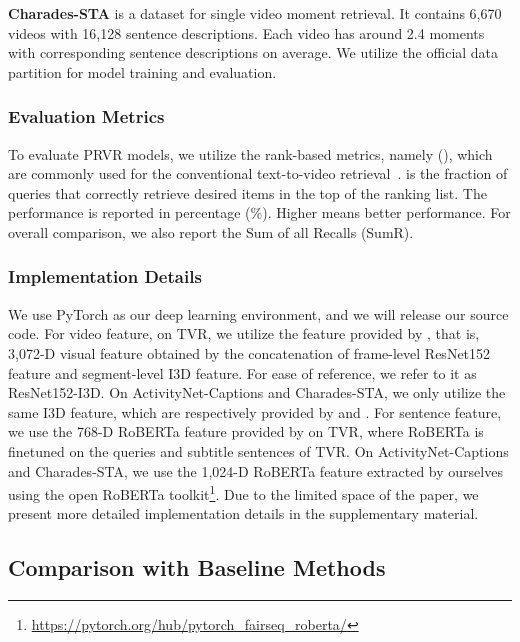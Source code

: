 \documentclass[sigconf]{acmart}
\begin{document}
 \textbf{Charades-STA} \cite{gao2017tall} is a dataset for single video moment retrieval. It contains 6,670 videos with 16,128 sentence descriptions. Each video has around 2.4 moments with corresponding sentence descriptions on average. We utilize the official data partition for model training and evaluation.



\subsubsection{Evaluation Metrics}
To evaluate PRVR models, we utilize the rank-based metrics, namely  (), which are commonly used for the conventional text-to-video retrieval~\cite{wang2020learning,dong2021dual}. 
 is the fraction of queries that correctly retrieve desired items in the top  of the ranking list. 
The performance is reported in percentage (\%).
Higher  means better performance. For overall comparison, we also report the Sum of all Recalls (SumR).


\subsubsection{Implementation Details}
We use PyTorch as our deep learning environment, and we will release our source code.
For video feature, on TVR, we utilize the feature provided by \cite{lei2020tvr}, that is, 3,072-D  visual feature obtained by the concatenation of frame-level ResNet152 \cite{he2016deep} feature and segment-level I3D \cite{carreira2017quo} feature.
For ease of reference, we refer to it as ResNet152-I3D.
On ActivityNet-Captions and  Charades-STA, we only utilize the same I3D feature, which are respectively provided by \cite{zhang2020hierarchical} and \cite{mun2020local}.
For sentence feature, we use the 768-D RoBERTa feature provided by \cite{lei2020tvr} on TVR, where RoBERTa is finetuned on the queries and subtitle sentences of TVR.
On ActivityNet-Captions and  Charades-STA, we use the 1,024-D RoBERTa feature extracted by ourselves using the open RoBERTa toolkit\footnote{\url{https://pytorch.org/hub/pytorch_fairseq_roberta/}}.
Due to the limited space of the paper, we present more detailed implementation details in the supplementary material.



\subsection{Comparison with Baseline Methods} \label{ssec:exp-sota}
\end{document}
